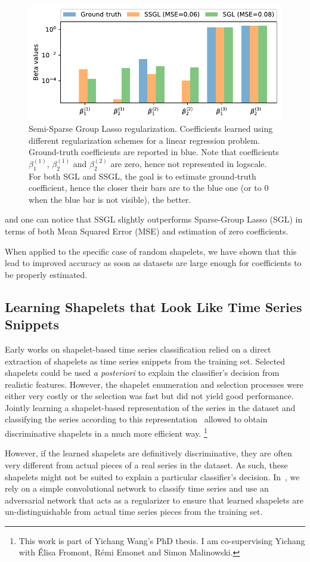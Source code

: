 \begin{figure}[t]
\centering
\includegraphics[width=.8\textwidth]{fig/ssgl}
\caption{Semi-Sparse Group Lasso regularization. Coefficients learned using
different regularization schemes for a linear regression problem. Ground-truth
coefficients are reported in blue.
Note that coefficients $\beta_1^{(1)}$, $\beta_2^{(1)}$ and $\beta_2^{(2)}$ are
zero, hence not represented in logscale.
For both SGL and SSGL, the goal is to estimate ground-truth coefficient, hence
the closer their bars are to the blue one (or to 0 when the blue bar is not
visible), the better.
\label{fig:ssgl}}
\end{figure}

and one can notice that SSGL slightly outperforms Sparse-Group Lasso (SGL) in
terms of both Mean Squared Error (MSE) and estimation of zero coefficients.

When applied to the specific case of random shapelets, we have shown that this
lead to improved accuracy as soon as datasets are large enough for coefficients
to be properly estimated.

\subsection{Learning Shapelets that Look Like Time Series Snippets}

Early works on shapelet-based time series classification relied on a direct
extraction of shapelets as time series snippets from the training set.
Selected shapelets could be used \emph{a posteriori} to explain the classifier's
decision from realistic features.
However, the shapelet enumeration and selection processes were either very
costly or the selection was fast but did not yield good performance.
Jointly learning a shapelet-based representation of the series in the dataset
and classifying the series according to this
representation~\cite{grabocka2014learning} allowed to obtain
discriminative shapelets in a much more efficient way.%
\footnote{This work is part of Yichang Wang's PhD thesis.
I am co-supervising Yichang with Élisa Fromont, Rémi Emonet and Simon
Malinowski.}

However, if the learned shapelets are definitively discriminative, they are
often very different from actual pieces of a real series in the
dataset. As such, these shapelets might not be suited to explain a particular
classifier's decision.
In~\cite{wang2019},
we rely on a simple convolutional network to classify time
series and use an adversarial network that acts as a regularizer to ensure that
learned shapelets are un-distinguishable from actual time series pieces from
the training set.
